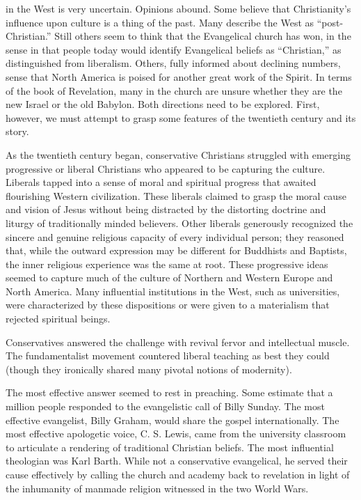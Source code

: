 
 in the West is very uncertain. Opinions abound. Some believe that
Christianity’s influence upon culture is a thing of the past. Many describe the West as
“post-Christian.” Still others seem to think that the Evangelical church has won, in the sense in
that people today would identify Evangelical beliefs as “Christian,” as distinguished from
liberalism. Others, fully informed about declining numbers, sense that North America is poised for
another great work of the Spirit. In terms of the book of Revelation, many in the church are unsure
whether they are the new Israel or the old Babylon. Both directions need to be explored. First,
however, we must attempt to grasp some features of the twentieth century and its story.

As the twentieth century began, conservative Christians struggled with emerging progressive or
liberal Christians who appeared to be capturing the culture. Liberals tapped into a sense of moral
and spiritual progress that awaited flourishing Western civilization. These liberals claimed to
grasp the moral cause and vision of Jesus without being distracted by the distorting doctrine and
liturgy of traditionally minded believers. Other liberals generously recognized the sincere and
genuine religious capacity of every individual person; they reasoned that, while the outward
expression may be different for Buddhists and Baptists, the inner religious experience was the same
at root. These progressive ideas seemed to capture much of the culture of Northern and Western
Europe and North America. Many influential institutions in the West, such as universities, were
characterized by these dispositions or were given to a materialism that rejected spiritual beings.

Conservatives answered the challenge with revival fervor and intellectual muscle. The fundamentalist
movement countered liberal teaching as best they could (though they ironically shared many pivotal
notions of modernity).

The most effective answer seemed to rest in preaching. Some estimate that a million people responded
to the evangelistic call of Billy Sunday. The most effective evangelist, Billy Graham, would share
the gospel internationally. The most effective apologetic voice, C. S. Lewis, came from the
university classroom to articulate a rendering of traditional Christian beliefs. The most
influential theologian was Karl Barth. While not a conservative evangelical, he served their cause
effectively by calling the church and academy back to revelation in light of the inhumanity of
manmade religion witnessed in the two World Wars.

